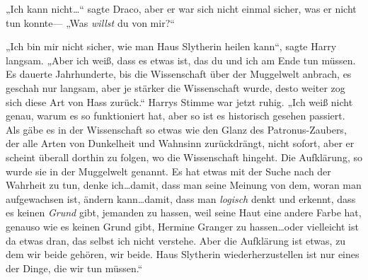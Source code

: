 „Ich kann nicht…“ sagte Draco, aber er war sich nicht einmal sicher, was er nicht tun konnte— „Was \emph{willst} du von mir?“

„Ich bin mir nicht sicher, wie man Haus Slytherin heilen kann“, sagte Harry langsam. „Aber ich weiß, dass es etwas ist, das du und ich am Ende tun müssen. Es dauerte Jahrhunderte, bis die Wissenschaft über der Muggelwelt anbrach, es geschah nur langsam, aber je stärker die Wissenschaft wurde, desto weiter zog sich diese Art von Hass zurück.“ Harrys Stimme war jetzt ruhig. „Ich weiß nicht genau, warum es so funktioniert hat, aber so ist es historisch gesehen passiert. Als gäbe es in der Wissenschaft so etwas wie den Glanz des Patronus-Zaubers, der alle Arten von Dunkelheit und Wahnsinn zurückdrängt, nicht sofort, aber er scheint überall dorthin zu folgen, wo die Wissenschaft hingeht. Die Aufklärung, so wurde sie in der Muggelwelt genannt.%
Es hat etwas mit der Suche nach der Wahrheit zu tun, denke ich…damit, dass man seine Meinung von dem, woran man aufgewachsen ist, ändern kann…damit, dass man \emph{logisch} denkt und erkennt, dass es keinen \emph{Grund} gibt, jemanden zu hassen, weil seine Haut eine andere Farbe hat, genauso wie es keinen Grund gibt, Hermine Granger zu hassen…oder vielleicht ist da etwas dran, das selbst ich nicht verstehe. Aber die Aufklärung ist etwas, zu dem wir beide gehören, wir beide. Haus Slytherin wiederherzustellen ist nur eines der Dinge, die wir tun müssen.“

